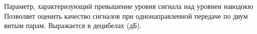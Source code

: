 Параметр, характеризующий превышение уровня сигнала над 
уровнеи наводокю Позволяет оценить качество сигналов при 
однонаправленной передаче по двум витым парам. Выражается
в децибелах (дБ).
